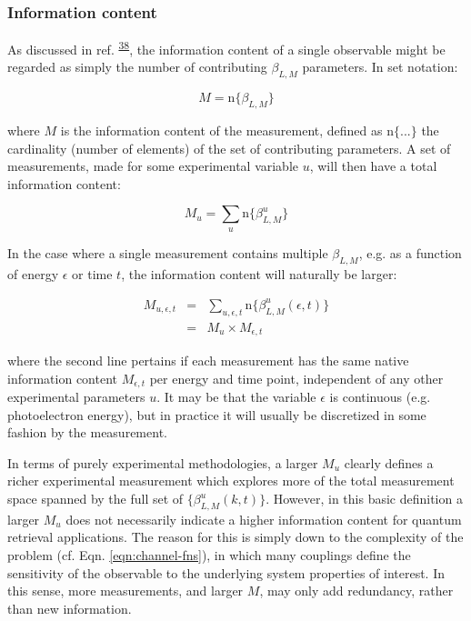 \documentclass[10pt]{article}
\begin{document}
\subsubsection{Information content\label{sec:info-content}}

As discussed in ref. \textsuperscript{\hyperref[csl:38]{38}}, the information content of a single observable might be regarded as simply the number of contributing $\beta_{L,M}$ parameters. In set notation:

\begin{equation}
M=\mathrm{n}\{\beta_{L,M}\}
\end{equation}

where $M$ is the information content of the measurement, defined
as $\mathrm{n}\{...\}$ the cardinality (number of elements) of the
set of contributing parameters. A set of measurements, made for some
experimental variable $u$, will then have a total information content:

\begin{equation}
M_{u}=\sum_{u}\mathrm{n}\{\beta_{L,M}^{u}\}
\end{equation}

In the case where a single measurement contains multiple $\beta_{L,M}$, e.g. as a function of energy $\epsilon$ or time $t$, the information content will naturally be larger:

\begin{eqnarray}
M_{u,\epsilon,t} & = & \sum_{u,\epsilon,t}\mathrm{n}\{\beta_{L,M}^{u}(\epsilon,t)\}\\
 & = & M_{u}\times M_{\epsilon,t}
\end{eqnarray}

where the second line pertains if each measurement has the same native
information content $M_{\epsilon,t}$ per energy and time point, independent of any other experimental parameters $u$. It may be that the variable
$\epsilon$ is continuous (e.g. photoelectron energy), but in practice it
will usually be discretized in some fashion by the measurement.

In terms of purely experimental methodologies, a larger $M_{u}$ clearly defines a richer experimental measurement which explores more of the total measurement space spanned by the full set of $\{\beta_{L,M}^{u}(k,t)\}$. However, in this basic definition a larger $M_{u}$ does not necessarily indicate a higher information content for quantum retrieval applications.
The reason for this is simply down to the complexity of the problem
(cf. Eqn. \ref{eqn:channel-fns}), in which many couplings define
the sensitivity of the observable to the underlying system properties
of interest. In this sense, more measurements, and larger $M$, may
only add redundancy, rather than new information.
\end{document}

